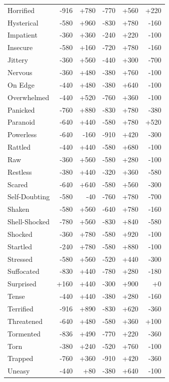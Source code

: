 \begin{longtable}{@{}p{}rrrrr}
Horrified & -916 & +780 & -770 & +560 & +220 \\
Hysterical & -580 & +960 & -830 & +780 & -160 \\
Impatient & -360 & +360 & -240 & +220 & -100 \\
Insecure & -580 & +160 & -720 & +780 & -160 \\
Jittery & -360 & +560 & -440 & +300 & -700 \\
Nervous & -360 & +480 & -380 & +760 & -100 \\
On Edge & -440 & +480 & -380 & +640 & -100 \\
Overwhelmed & -440 & +520 & -760 & +360 & -100 \\
Panicked & -760 & +880 & -830 & +780 & -380 \\
Paranoid & -640 & +440 & -580 & +780 & +520 \\
Powerless & -640 & -160 & -910 & +420 & -300 \\
Rattled & -440 & +440 & -580 & +680 & -100 \\
Raw & -360 & +560 & -580 & +280 & -100 \\
Restless & -380 & +440 & -320 & +360 & -580 \\
Scared & -640 & +640 & -580 & +560 & -300 \\
Self-Doubting & -580 & -40 & -760 & +780 & -700 \\
Shaken & -580 & +560 & -640 & +780 & -160 \\
Shell-Shocked & -780 & +560 & -830 & +840 & -580 \\
Shocked & -360 & +780 & -580 & +920 & -100 \\
Startled & -240 & +780 & -580 & +880 & -100 \\
Stressed & -580 & +560 & -520 & +440 & -300 \\
Suffocated & -830 & +440 & -780 & +280 & -180 \\
Surprised & +160 & +440 & -300 & +900 & +0 \\
Tense & -440 & +440 & -380 & +280 & -160 \\
Terrified & -916 & +890 & -830 & +620 & -360 \\
Threatened & -640 & +480 & -580 & +360 & +100 \\
Tormented & -836 & +490 & -770 & +220 & -360 \\
Torn & -380 & +240 & -520 & +760 & -100 \\
Trapped & -760 & +360 & -910 & +420 & -360 \\
Uneasy & -440 & +80 & -380 & +640 & -100 \\

\end{longtable}
